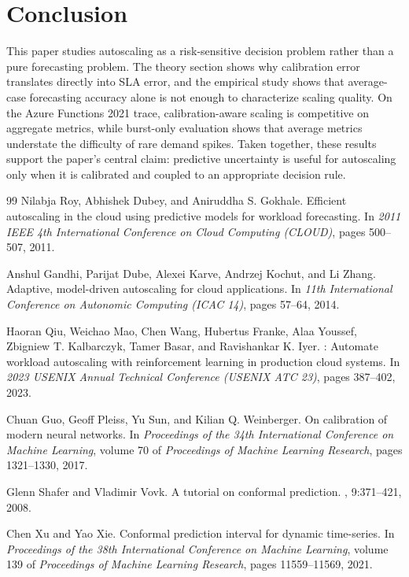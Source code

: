 \documentclass[11pt]{article}
\theoremstyle{plain}
\theoremstyle{definition}
\theoremstyle{remark}
\begin{document}
\section{Conclusion}
This paper studies autoscaling as a risk-sensitive decision problem rather than a pure forecasting problem. The theory section shows why calibration error translates directly into SLA error, and the empirical study shows that average-case forecasting accuracy alone is not enough to characterize scaling quality. On the Azure Functions 2021 trace, calibration-aware scaling is competitive on aggregate metrics, while burst-only evaluation shows that average metrics understate the difficulty of rare demand spikes. Taken together, these results support the paper's central claim: predictive uncertainty is useful for autoscaling only when it is calibrated and coupled to an appropriate decision rule.

\begin{thebibliography}{99}
Nilabja Roy, Abhishek Dubey, and Aniruddha S. Gokhale.
\newblock Efficient autoscaling in the cloud using predictive models for workload forecasting.
\newblock In {\em 2011 IEEE 4th International Conference on Cloud Computing (CLOUD)}, pages 500--507, 2011.

Anshul Gandhi, Parijat Dube, Alexei Karve, Andrzej Kochut, and Li Zhang.
\newblock Adaptive, model-driven autoscaling for cloud applications.
\newblock In {\em 11th International Conference on Autonomic Computing (ICAC 14)}, pages 57--64, 2014.

Haoran Qiu, Weichao Mao, Chen Wang, Hubertus Franke, Alaa Youssef, Zbigniew T. Kalbarczyk, Tamer Basar, and Ravishankar K. Iyer.
: Automate workload autoscaling with reinforcement learning in production cloud systems.
\newblock In {\em 2023 USENIX Annual Technical Conference (USENIX ATC 23)}, pages 387--402, 2023.

Chuan Guo, Geoff Pleiss, Yu Sun, and Kilian Q. Weinberger.
\newblock On calibration of modern neural networks.
\newblock In {\em Proceedings of the 34th International Conference on Machine Learning}, volume 70 of {\em Proceedings of Machine Learning Research}, pages 1321--1330, 2017.

Glenn Shafer and Vladimir Vovk.
\newblock A tutorial on conformal prediction.
, 9:371--421, 2008.

Chen Xu and Yao Xie.
\newblock Conformal prediction interval for dynamic time-series.
\newblock In {\em Proceedings of the 38th International Conference on Machine Learning}, volume 139 of {\em Proceedings of Machine Learning Research}, pages 11559--11569, 2021.
\end{thebibliography}
\end{document}
